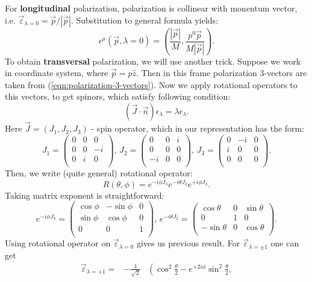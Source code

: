 \documentclass[12pt]{revtex4-1}
\newcommand{\jx}{\left( \begin{array}{ccc}
0 & 0 & 0 \\
0 & 0 & -i \\
0 & i & 0 \\
\end{array}
\right)}
\newcommand{\jy}{\left( \begin{array}{ccc}
0 & 0 & i \\
0 & 0 & 0 \\
-i & 0 & 0 \\
\end{array}
\right)}
\newcommand{\jz}{\left( \begin{array}{ccc}
0 & -i & 0 \\
i & 0 & 0 \\
0 & 0 & 0 \\
\end{array}
\right)}
\begin{document}
\begin{appendices}
	For \textbf{longitudinal} polarization, polarization is collinear with
	monentum vector, i.e. $\vec{\varepsilon}_{\lambda = 0} = \vec{p}/|\vec{p}|$.
	Substitution to general formula yields:
	\begin{equation}
		\epsilon^{\mu}(\vec p, \lambda = 0) = \left( \frac{|\vec{p}|}{M} ,
		\frac{p^0 \vec{p}}{M |\vec{p}|}	\right).
	\end{equation}
	To obtain \textbf{transversal} polarization, we will use another trick.
	Suppose we work in coordinate system, where $\vec{p} = p \hat{z}$.
	Then in this frame polarization 3-vectors are taken from 
	(\ref{eqn:polarization-3-vectors}). Now we apply rotational operators
	to this vectors, to get spinors, which satisfy following condition:
	\begin{equation}
		(\vec{J} \cdot \vec{n} ) \epsilon_{\lambda} = \lambda \epsilon_{\lambda}.
	\end{equation}
	Here $\vec{J} = (J_1, J_2, J_3)$ - spin operator, which in our representation
	has the form:
	\begin{equation}
		J_1 = \jx,\, J_2 = \jy,\, J_3 = \jz. 
	\end{equation}
	Then, we write (quite general) rotational operator:
	\begin{equation}
		R(\theta, \phi) = e^{-i \phi J_3} e^{- i \theta J_2} e^{+ i \phi J_3}.
	\end{equation}
	Taking matrix exponent is straightforward:
	\begin{equation*}
	e^{-i \phi J_3} = 
	\left(
	\begin{array}{ccc}
	\cos \phi & -\sin\phi & 0 \\
	\sin \phi & \cos \phi & 0 \\
	0 & 0 & 1 \\
	\end{array}
	\right),\,
	e^{-i \theta J_2} = 
	\left(
	\begin{array}{ccc}
	\cos \theta & 0 & \sin \theta \\
	0 & 1 & 0 \\
	-\sin \theta & 0 & \cos \theta \\
	\end{array}
	\right).
	\end{equation*}
	Using rotational operator on $\vec \varepsilon_{\lambda = 0}$ gives us
	previous result. For $\vec \varepsilon_{\lambda = \pm 1}$ one can get
	\begin{align} \label{eqn:polarization-3-vectors}
		\vec{\varepsilon}_{\lambda = +1}= & -\frac{1}{\sqrt{2}} &
		\left(\cos^2 \frac{\theta}{2} - e^{+2 i \phi}\sin^2 \frac{\theta}{2} ,

\end{align}
\end{appendices}
\end{document}
